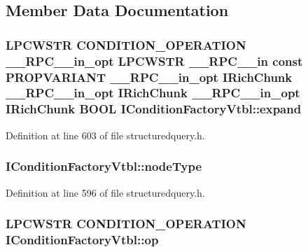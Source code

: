 \subsection{Member Data Documentation}
\subsubsection[{\texorpdfstring{expand}{expand}}]{ {\bf L\+P\+C\+W\+S\+TR} {\bf C\+O\+N\+D\+I\+T\+I\+O\+N\+\_\+\+O\+P\+E\+R\+A\+T\+I\+ON} {\bf \+\_\+\+\_\+\+R\+P\+C\+\_\+\+\_\+in\+\_\+opt} {\bf L\+P\+C\+W\+S\+TR} {\bf \+\_\+\+\_\+\+R\+P\+C\+\_\+\+\_\+in} {\bf const} {\bf P\+R\+O\+P\+V\+A\+R\+I\+A\+NT} {\bf \+\_\+\+\_\+\+R\+P\+C\+\_\+\+\_\+in\+\_\+opt} {\bf I\+Rich\+Chunk} {\bf \+\_\+\+\_\+\+R\+P\+C\+\_\+\+\_\+in\+\_\+opt} {\bf I\+Rich\+Chunk} {\bf \+\_\+\+\_\+\+R\+P\+C\+\_\+\+\_\+in\+\_\+opt} {\bf I\+Rich\+Chunk} {\bf B\+O\+OL} I\+Condition\+Factory\+Vtbl\+::expand}\hypertarget{struct_i_condition_factory_vtbl_a80202864dced9d1e48ee9b6e113e0b3b}{}\label{struct_i_condition_factory_vtbl_a80202864dced9d1e48ee9b6e113e0b3b}


Definition at line 603 of file structuredquery.\+h.

\subsubsection[{\texorpdfstring{node\+Type}{nodeType}}]{ I\+Condition\+Factory\+Vtbl\+::node\+Type}\hypertarget{struct_i_condition_factory_vtbl_a7aba74e62b85e7e73ecef2a22e4976f8}{}\label{struct_i_condition_factory_vtbl_a7aba74e62b85e7e73ecef2a22e4976f8}


Definition at line 596 of file structuredquery.\+h.

\subsubsection[{\texorpdfstring{op}{op}}]{ {\bf L\+P\+C\+W\+S\+TR} {\bf C\+O\+N\+D\+I\+T\+I\+O\+N\+\_\+\+O\+P\+E\+R\+A\+T\+I\+ON} I\+Condition\+Factory\+Vtbl\+::op}\hypertarget{struct_i_condition_factory_vtbl_aa822a631c382e23c42fa514ad384f7fb}{}\label{struct_i_condition_factory_vtbl_aa822a631c382e23c42fa514ad384f7fb}


